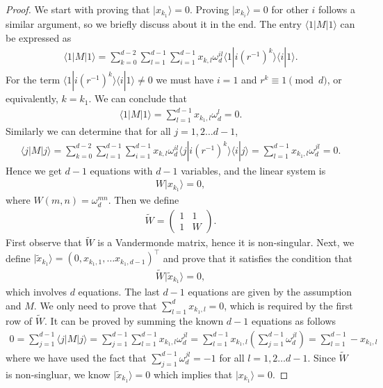 \documentclass[11pt,letterpaper]{article}
\newcommand{\ket}[1]{|#1\rangle}
\newcommand{\bra}[1]{\langle#1|}
\newcommand{\braket}[2]{\langle#1|#2\rangle}
\newcommand{\1}{\mathbb{1}}
\newcommand{\tW}{\tilde{W}}
\newcommand{\tx}{\tilde{x}}
\theoremstyle{definition}
\begin{document}
\begin{proof}
We start with proving that $\ket{x_{k_1}} = 0$.
Proving $\ket{x_{k_i}} = 0$ for other $i$ follows a similar argument, so we briefly
discuss about it in the end.
The entry $\bra{1}M\ket{1}$ can be expressed as  
\begin{align}
	\bra{1}M\ket{1} = \sum_{k=0}^{d-2}\sum_{l = 1}^{d-1}\sum_{i=1}^{d-1} x_{k, l}\omega_d^{il}\braket{1}{i (r^{-1})^k}\braket{i}{1}.
\end{align}
For the term $\braket{1}{i (r^{-1})^k}\braket{i}{1} \neq 0$ we must have $i = 1$ and $r^k \equiv 1 \pmod{d}$, or equivalently,
$k = k_1$. We can conclude that 
\begin{align}
	\bra{1}M\ket{1} = \sum_{l = 1}^{d-1} x_{k_1,l}\omega_d^l = 0. 
\end{align}
Similarly we can determine that for all $j = 1,2\dots d-1$,
\begin{align}
	\bra{j}M\ket{j} 
	=  \sum_{k=0}^{d-2}\sum_{l = 1}^{d-1}\sum_{i=1}^{d-1} x_{k, l}\omega_d^{il}\braket{j}{i (r^{-1})^k}\braket{i}{j} 
	= \sum_{l = 1}^{d-1}x_{k_1,l}\omega_d^{jl} = 0.
\end{align}
Hence we get $d-1$ equations with $d-1$ variables, and the linear system is
\begin{align}
	W \ket{x_{k_1}} = 0,
\end{align}
where $W(m,n) = \omega_d^{mn}$. Then we define
\begin{align}
	\tW = 
	\begin{pmatrix}
	1 & 1 \\
	1 & W
	\end{pmatrix}.
\end{align}
First observe that $\tW$ is a Vandermonde matrix, hence it is non-singular.
Next, we define $\ket{\tx_{k_1}} = (0, x_{k_1,1}, \dots x_{k_1,d-1})^\intercal$ 
and prove that it satisfies the condition
that 
\begin{align}
	\tW \ket{\tx_{k_1}} = 0,
\end{align}
which involves $d$ equations. The last $d-1$ equations are given by the assumption and $M$.
We only need to prove that $\sum_{l=1}^d x_{k_1, l} = 0$, which is required by the first row of $\tW$.
It can be proved by summing the known $d-1$ equations as follows
\begin{align}
	0=\sum_{j = 1}^{d-1} \bra{j}M\ket{j}  
	=  \sum_{j=1}^{d-1}\sum_{l = 1}^{d-1}x_{k_1,l}\omega_d^{jl}
	=\sum_{l = 1}^{d-1}x_{k_1,l} (\sum_{j=1}^{d-1} \omega_d^{jl})
	= \sum_{l = 1}^{d-1}- x_{k_1,l}
\end{align}
where we have used the fact that $\sum_{j=1}^{d-1} \omega_d^{jl} =-1$ for all $l = 1,2\dots d-1$.
Since $\tW$ is non-singluar, we know $\ket{\tx_{k_1}} = 0$ which implies that $\ket{x_{k_1}} = 0$.


\end{proof}
\end{document}
